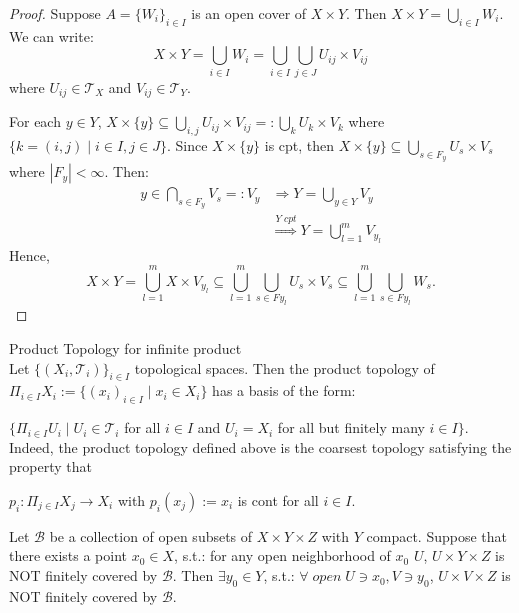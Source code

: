 \begin{proof}
    Suppose $A = \{W_i \} _{i\in I}$ is an open cover of $X\times Y$. Then $X\times Y = \bigcup_{i\in I} W_i$. We can write: 
    $$X\times Y = \bigcup_{i\in I} W_i = \bigcup_{i\in I} \bigcup_{j\in J} U_{ij} \times V_{ij}$$
    where $U_{ij} \in \mathcal{T}_X$ and $V_{ij} \in \mathcal{T}_Y$.

    For each $y\in Y$, $X \times \{y\} \subseteq \bigcup_{i,j} U_{ij} \times V_{ij} =: \bigcup_{k} U_{k} \times V_{k}$ where $\{ k=(i,j) \mid i \in I, j \in J\}$. Since $X\times \{y\}$ is cpt, then $X \times \{y\} \subseteq \bigcup_{s \in F_y} U_{s} \times V_{s}$ where $|F_y| < \infty$. Then:
    \begin{align*}
        y \in \bigcap_{s \in F_y} V_s =: V_y &\Rightarrow Y= \bigcup_{y\in Y} V_y \\
        &\overset{Y \; cpt}{\Rightarrow} Y= \bigcup _{l=1}^m V_{y_l}
    \end{align*}
    Hence,
    $$X\times Y = \bigcup_{l=1}^m X\times V_{y_l} \subseteq \bigcup_{l=1}^m \bigcup_{s \in F_{}y_l} U_{s} \times V_{s} \subseteq \bigcup_{l=1}^m \bigcup_{s \in F_{}y_l} W_{s}. $$
\end{proof}

\begin{definition}{Product Topology for infinite product}\\
Let $\{(X_i, \mathcal{T}_i)\}_{i\in I}$ topological spaces. Then the product topology of $\Pi_{i\in I} X_i := \{(x_i)_{i\in I} \mid x_i \in X_i\}$ has a basis of the form:

$\{ \Pi_{i\in I} U_i \mid U_i \in \mathcal{T}_i$ for all $i\in I$ and $U_i=X_i$ for all but finitely many $i\in I\}$.\\
Indeed, the product topology defined above is the coarsest topology satisfying the property that

$p_i :\Pi_{j\in I} X_j \rightarrow X_i$ with $p_i(x_j) := x_i$ is cont for all $i\in I$.
\end{definition}

\begin{lemma}
    Let $\mathcal{B}$ be a collection of open subsets of $X \times Y \times Z$ with $Y$ compact. Suppose that there exists a point $x_0 \in X$, s.t.: for any open neighborhood of $x_0$ $U$, $U \times Y \times Z$ is NOT finitely covered by $\mathcal{B}$. Then $\exists y_0 \in Y$, s.t.: $\forall \;open\;U\ni x_0,V\ni y_0$, $U \times V \times Z$ is NOT finitely covered by $\mathcal{B}$.
\end{lemma}

